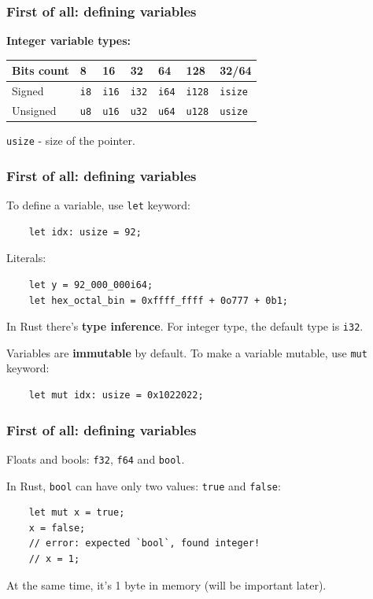 \documentclass[aspectratio=1610,t]{beamer}
\begin{document}
\begin{frame}[fragile]
\frametitle{First of all: defining variables}
\textbf{Integer variable types:}

\begin{table}[]
\begin{tabular}{|l|l|l|l|l|l|l|}
\hline
Bits count & 8  & 16  & 32  & 64  & 128  & 32/64 \\ \hline
Signed     & \texttt{i8} & \texttt{i16} & \texttt{i32} & \texttt{i64} & \texttt{i128} & \texttt{isize} \\ \hline
Unsigned   & \texttt{u8} & \texttt{u16} & \texttt{u32} & \texttt{u64} & \texttt{u128} & \texttt{usize} \\ \hline
\end{tabular}
\end{table}

\texttt{usize} - size of the pointer.
\end{frame}


\begin{frame}[fragile]
\frametitle{First of all: defining variables}
To define a variable, use \texttt{let} keyword:

\begin{verbatim}
    let idx: usize = 92;
\end{verbatim}

Literals:

\begin{verbatim}
    let y = 92_000_000i64;
    let hex_octal_bin = 0xffff_ffff + 0o777 + 0b1;
\end{verbatim}

In Rust there's \textbf{type inference}. For integer type, the default type is \texttt{i32}.

Variables are \textbf{immutable} by default. To make a variable mutable, use \texttt{mut} keyword:

\begin{verbatim}
    let mut idx: usize = 0x1022022;
\end{verbatim}
\end{frame}


\begin{frame}[fragile]
\frametitle{First of all: defining variables}
Floats and bools: \texttt{f32}, \texttt{f64} and \texttt{bool}.

In Rust, \texttt{bool} can have only two values: \texttt{true} and \texttt{false}:

\begin{verbatim}
    let mut x = true;
    x = false;
    // error: expected `bool`, found integer!
    // x = 1;
\end{verbatim}

At the same time, it's 1 byte in memory (will be important later).


\end{frame}
\end{document}
